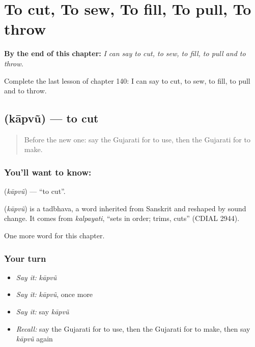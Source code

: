 
\chapter{To cut, To sew, To fill, To pull, To throw}
\label{ch:gu-to-cut-to-sew-to-fill-to-pull-to-throw}

\begin{chapteropening}
\textbf{By the end of this chapter:} \emph{I can say to cut, to sew, to fill, to pull and to throw.}

Complete the last lesson of chapter 140: I can say to cut, to sew, to fill, to pull and to throw.
\end{chapteropening}

\section[\texorpdfstring{\gu{કાપવું} (kāpvũ)}{કાપવું (kāpvũ)}]{ (kāpvũ) — to cut}

\label{lesson:GU-C140-kapvu}



\begin{quote}
Before the new one: say the Gujarati for to use, then the Gujarati for to make.
\end{quote}

\subsection*{You'll want to know: }
\textbf{} (\emph{kāpvũ}) — \textquotedblleft{}to cut\textquotedblright{}.

\begin{cousinweb}
\textbf{} (\emph{kāpvũ}) is a tadbhava, a word inherited from Sanskrit and reshaped by sound change. It comes from \emph{kalpayati}, \textquotedblleft{}sets in order; trims, cuts\textquotedblright{} (CDIAL 2944).
\end{cousinweb}

\begin{grammarlens}[title={What you've built}]
One more word for this chapter.
\end{grammarlens}

\subsection*{Your turn}
\begin{itemize}
\raggedright
  \item \emph{Say it:} \emph{kāpvũ}
  \item \emph{Say it:} \emph{kāpvũ}, once more
  \item \emph{Say it:} say \emph{kāpvũ}
  \item \emph{Recall:} say the Gujarati for to use, then the Gujarati for to make, then say \emph{kāpvũ} again
\end{itemize}

